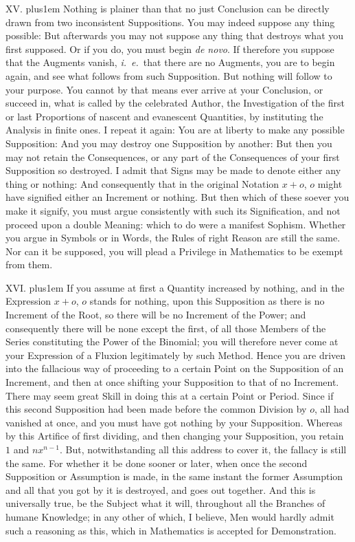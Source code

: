 XV. \hskip 0pt plus1em
Nothing is plainer than that no just Conclusion can be directly
drawn from two inconsistent Suppositions.  You may indeed suppose
any thing possible: But afterwards you may not suppose any thing
that destroys what you first supposed.  Or if you do, you must
begin {\it de novo}.  If therefore you suppose that the Augments
vanish, {\it i.~e.}\ that there are no Augments, you are to begin
again, and see what follows from such Supposition.  But nothing
will follow to your purpose.  You cannot by that means ever
arrive at your Conclusion, or succeed in, what is called by the
celebrated Author, the Investigation of the first or last
Proportions of nascent and evanescent Quantities, by instituting
the Analysis in finite ones.  I repeat it again: You are at
liberty to make any possible Supposition: And you may destroy one
Supposition by another: But then you may not retain the
Consequences, or any part of the Consequences of your first
Supposition so destroyed.  I admit that Signs may be made to
denote either any thing or nothing: And consequently that in the
original Notation $x + o$, $o$ might have signified either an
Increment or nothing.  But then which of these soever you make it
signify, you must argue consistently with such its Signification,
and not proceed upon a double Meaning: which to do were a
manifest Sophism.  Whether you argue in Symbols or in Words, the
Rules of right Reason are still the same.  Nor can it be
supposed, you will plead a Privilege in Mathematics to be exempt
from them.

\medbreak

XVI. \hskip 0pt plus1em
If you assume at first a Quantity increased by nothing, and in
the Expression $x + o$, $o$ stands for nothing, upon this
Supposition as there is no Increment of the Root, so there will
be no Increment of the Power; and consequently there will be none
except the first, of all those Members of the Series constituting
the Power of the Binomial; you will therefore never come at your
Expression of a Fluxion legitimately by such Method.  Hence you
are driven into the fallacious way of proceeding to a certain
Point on the Supposition of an Increment, and then at once
shifting your Supposition to that of no Increment.  There may
seem great Skill in doing this at a certain Point or Period.
Since if this second Supposition had been made before the common
Division by $o$, all had vanished at once, and you must have got
nothing by your Supposition.  Whereas by this Artifice of first
dividing, and then changing your Supposition, you retain $1$ and
$nx^{n-1}$.  But, notwithstanding all this address to cover it,
the fallacy is still the same.  For whether it be done sooner or
later, when once the second Supposition or Assumption is made, in
the same instant the former Assumption and all that you got by it
is destroyed, and goes out together.  And this is universally
true, be the Subject what it will, throughout all the Branches of
humane Knowledge; in any other of which, I believe, Men would
hardly admit such a reasoning as this, which in Mathematics is
accepted for Demonstration.

